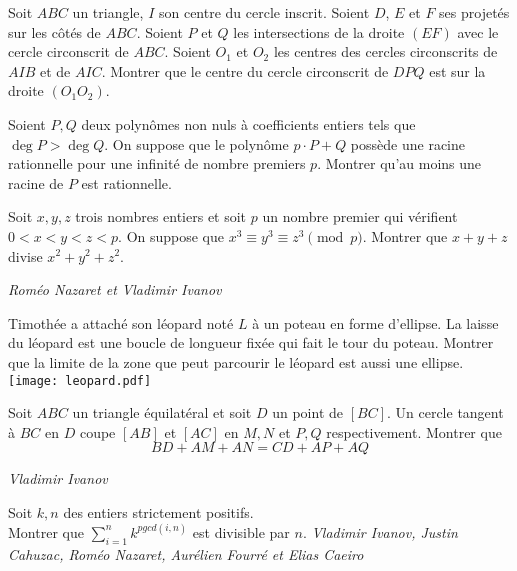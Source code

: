 \begin{exo}{}
Soit $ABC$ un triangle, $I$ son centre du cercle inscrit. Soient $D$, $E$ et $F$ ses projetés sur les côtés de $ABC$. Soient $P$ et $Q$ les intersections de la droite $(EF)$ avec le cercle circonscrit de $ABC$. Soient $O_1$ et $O_2$ les centres des cercles circonscrits de $AIB$ et de $AIC$. Montrer que le centre du cercle circonscrit de $DPQ$ est sur la droite $(O_1O_2)$.
\end{exo}

\begin{exo}{}
Soient $P,Q$ deux polynômes non nuls à coefficients entiers tels que $ \deg P>\deg Q$. On suppose que le polynôme $p \cdot P+Q$ possède une racine rationnelle pour une infinité de nombre premiers $p$. Montrer qu'au moins une racine de $P$ est rationnelle.
\end{exo}



\begin{exo}{}
Soit $x,y,z$ trois nombres entiers et soit $p$ un nombre premier qui vérifient $0<x<y<z<p$. On suppose que $x^3\equiv y^3\equiv z^3\pmod p$. Montrer que $x+y+z$ divise $x^2+y^2+z^2$.

\medskip
\textit{Roméo Nazaret et Vladimir Ivanov}
\end{exo}


\begin{exo}{}
 Timothée a attaché son léopard noté $L$ à un poteau en forme d'ellipse. La laisse du léopard est une boucle de longueur fixée qui fait le tour du poteau. Montrer que la limite de la zone que peut parcourir le léopard est aussi une ellipse. \\
\texttt{[image: leopard.pdf]}\end{exo}





\begin{exo}{}
Soit $ABC$ un triangle équilatéral et soit $D$ un point de $[BC]$. Un cercle tangent à $BC$ en $D$ coupe $[AB]$ et $[AC]$ en $M,N$ et $P,Q$ respectivement. Montrer que
$$BD+AM+AN=CD+AP+AQ$$

\medskip
\textit{Vladimir Ivanov}
\end{exo}

\begin{exo}{}
Soit $k, n$ des entiers strictement positifs. \\
Montrer que $\sum\limits_{i=1}^n k^{pgcd(i,n)}$ est divisible par $n$.
\medskip
\textit{Vladimir Ivanov, Justin Cahuzac, Roméo Nazaret, Aurélien Fourré et Elias Caeiro}
\end{exo}




